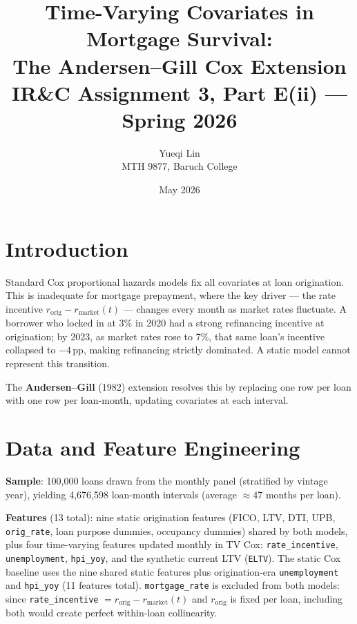 \documentclass[11pt,a4paper]{article}
\title{\vspace{-1.5em}\textbf{Time-Varying Covariates in Mortgage Survival:\\
The Andersen--Gill Cox Extension}\\[0.3em]
\large IR\&C Assignment 3, Part E(ii) --- Spring 2026}
\author{Yueqi Lin\\\small MTH 9877, Baruch College}
\date{May 2026}
\begin{document}
\maketitle
\vspace{-1.2em}

\section{Introduction}

Standard Cox proportional hazards models fix all covariates at loan origination.
This is inadequate for mortgage prepayment, where the key driver --- the rate incentive
$r_{\text{orig}} - r_{\text{market}}(t)$ --- changes every month as market rates fluctuate.
A borrower who locked in at 3\% in 2020 had a strong refinancing incentive at origination;
by 2023, as market rates rose to 7\%, that same loan's incentive collapsed to $-4$\,pp,
making refinancing strictly dominated. A static model cannot represent this transition.

The \textbf{Andersen--Gill} (1982) extension resolves this by replacing one row per loan
with one row per loan-month, updating covariates at each interval.

\section{Data and Feature Engineering}

\textbf{Sample}: 100,000 loans drawn from the monthly panel (stratified by vintage year),
yielding 4,676,598 loan-month intervals (average $\approx$47 months per loan).

\textbf{Features} (13 total): nine static origination features (FICO, LTV, DTI, UPB,
\texttt{orig\_rate}, loan purpose dummies, occupancy dummies) shared by both models,
plus four time-varying features updated monthly in TV Cox:
\texttt{rate\_incentive}, \texttt{unemployment}, \texttt{hpi\_yoy},
and the synthetic current LTV (\texttt{ELTV}).
The static Cox baseline uses the nine shared static features plus origination-era
\texttt{unemployment} and \texttt{hpi\_yoy} (11 features total).
\texttt{mortgage\_rate} is excluded from both models: since
\texttt{rate\_incentive} $= r_{\text{orig}} - r_{\text{market}}(t)$ and $r_{\text{orig}}$
is fixed per loan, including both would create perfect within-loan collinearity.
\end{document}
